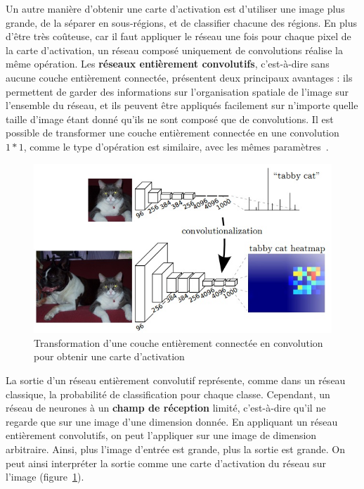 Un autre manière d'obtenir une carte d'activation est d'utiliser une image plus grande, de la séparer en sous-régions, et de classifier chacune des régions.
En plus d'être très coûteuse, car il faut appliquer le réseau une fois pour chaque pixel de la carte d'activation, un réseau composé uniquement de convolutions réalise la même opération.
Les \textbf{réseaux entièrement convolutifs}, c'est-à-dire sans aucune couche entièrement connectée, présentent deux principaux avantages : ils permettent de garder des informations sur l'organisation spatiale de l'image sur l'ensemble du réseau, et ils peuvent être appliqués facilement sur n'importe quelle taille d'image étant donné qu'ils ne sont composé que de convolutions.
Il est possible de transformer une couche entièrement connectée en une convolution $1*1$, comme le type d'opération est similaire, avec les mêmes paramètres~\cite{long_fully_2015}.

\begin{figure}%
\includegraphics[width=\columnwidth]{figures/FCN.jpg}%
\caption{Transformation d'une couche entièrement connectée en convolution pour obtenir une carte d'activation~\cite{long_fully_2015}}%
\label{fig:convolutionalisation}%
\end{figure}

La sortie d'un réseau entièrement convolutif représente, comme dans un réseau classique, la probabilité de classification pour chaque classe.
Cependant, un réseau de neurones à un \textbf{champ de réception} limité, c'est-à-dire qu'il ne regarde que sur une image d'une dimension donnée.
En appliquant un réseau entièrement convolutifs, on peut l'appliquer sur une image de dimension arbitraire.
Ainsi, plus l’image d’entrée est grande, plus la sortie est grande.
On peut ainsi interpréter la sortie comme une carte d'activation du réseau sur l'image (figure~\ref{fig:convolutionalisation}).

